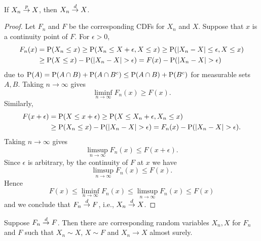 \begin{proposition}
    If $X_n\pto X$, then $X_n\dto X$. 
\end{proposition}
\begin{proof}
    Let $F_n$ and $F$ be the corresponding CDFs for $X_n$ and $X$. Suppose that 
    $x$ is a continuity point of $F$. For $\epsilon>0$, 
    \begin{equation*}
        \begin{split}
            F_n(x) &= \P(X_n\leq x) \geq \P(X_n \leq X + \epsilon, X \leq x) 
            \geq \P(\abs{X_n - X}\leq \epsilon, X\leq x) \\
            &\geq \P(X\leq x) - \P(\abs{X_n - X}> \epsilon) = F(x) - \P(\abs{X_n - X}>\epsilon)
        \end{split}
    \end{equation*}
    due to $\P(A) = \P(A\cap B) + \P(A\cap B^c) \leq \P(A\cap B) + \P(B^c)$ 
    for measurable sets $A,B$. Taking $n\to\infty$ gives 
    \begin{equation*}
        \liminf_{n\to\infty}F_n(x)\geq F(x). 
    \end{equation*}
    Similarly, 
    \begin{equation*}
        \begin{split}
            F(x+\epsilon) &= \P(X\leq x+\epsilon) \geq \P(X\leq X_n+\epsilon, X_n\leq x) \\
            &\geq \P(X_n\leq x) - \P(\abs{X_n - X}>\epsilon) 
            = F_n(x) - \P(\abs{X_n - X}>\epsilon). 
        \end{split}
    \end{equation*}
    Taking $n\to\infty$ gives 
    \begin{equation*}
        \limsup_{n\to\infty} F_n(x) \leq F(x+\epsilon). 
    \end{equation*}
    Since $\epsilon$ is arbitrary, by the continuity of $F$ at $x$ we have 
    \begin{equation*}
        \limsup_{n\to\infty} F_n(x) \leq F(x). 
    \end{equation*}
    Hence 
    \begin{equation*}
        F(x)\leq \liminf_{n\to\infty}F_n(x)\leq \limsup_{n\to\infty} F_n(x) \leq F(x)
    \end{equation*}
    and we conclude that $F_n\dto F$, i.e., $X_n\dto X$. 
\end{proof}

\begin{theorem}
    Suppose $F_n\dto F$. Then there are corresponding random 
    variables $X_n, X$ for $F_n$ and $F$ such that $X_n\sim X$,  
    $X\sim F$ and $X_n\to X$ almost surely. 
\end{theorem}